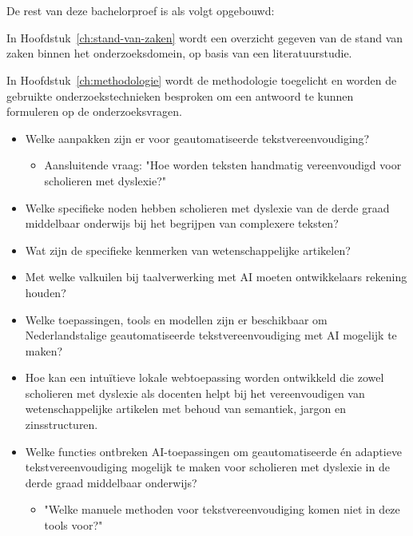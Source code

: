 \section{}%
\label{sec:opzet-bachelorproef}

De rest van deze bachelorproef is als volgt opgebouwd:

In Hoofdstuk~\ref{ch:stand-van-zaken} wordt een overzicht gegeven van de stand van zaken binnen het onderzoeksdomein, op basis van een literatuurstudie.

In Hoofdstuk~\ref{ch:methodologie} wordt de methodologie toegelicht en worden de gebruikte onderzoekstechnieken besproken om een antwoord te kunnen formuleren op de onderzoeksvragen.

\begin{itemize}
	\item Welke aanpakken zijn er voor geautomatiseerde tekstvereenvoudiging?
	\begin{itemize}
		\item Aansluitende vraag: "Hoe worden teksten handmatig vereenvoudigd voor scholieren met dyslexie?"
	\end{itemize}
	\item Welke specifieke noden hebben scholieren met dyslexie van de derde graad middelbaar onderwijs bij het begrijpen van complexere teksten?
	\item Wat zijn de specifieke kenmerken van wetenschappelijke artikelen? 
	\item Met welke valkuilen bij taalverwerking met AI moeten ontwikkelaars rekening houden?
	\item Welke toepassingen, tools en modellen zijn er beschikbaar om Nederlandstalige geautomatiseerde tekstvereenvoudiging met AI mogelijk te maken?
	\item Hoe kan een intuïtieve lokale webtoepassing worden ontwikkeld die zowel scholieren met dyslexie als docenten helpt bij het vereenvoudigen van wetenschappelijke artikelen met behoud van semantiek, jargon en zinsstructuren.
	\item Welke functies ontbreken AI-toepassingen om geautomatiseerde én adaptieve tekstvereenvoudiging mogelijk te maken voor \newline scholieren met dyslexie in de derde graad middelbaar onderwijs? 
	\begin{itemize}
		\item "Welke manuele methoden voor tekstvereenvoudiging komen niet in deze tools voor?"
	\end{itemize}
\end{itemize}

